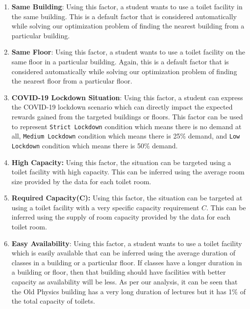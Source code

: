\begin{enumerate}
    \item \textbf{Same Building}: Using this factor, a student wants to use a toilet facility in the same building. This is a default factor that is considered automatically while solving our optimization problem of finding the nearest building from a particular building.
    
     \item \textbf{Same Floor}: Using this factor, a student wants to use a toilet facility on the same floor in a particular building. Again, this is a default factor that is considered automatically while solving our optimization problem of finding the nearest floor from a particular floor.
     
     \item \textbf{COVID-19 Lockdown Situation}: Using this factor, a student can express the COVID-19 lockdown scenario which can directly impact the expected rewards gained from the targeted buildings or floors. This factor can be used to represent \texttt{Strict Lockdown} condition which means there is no demand at all, \texttt{Medium Lockdown} condition which means there is 25\% demand, and \texttt{Low Lockdown} condition which means there is 50\% demand.
    
    \item \textbf{High Capacity:} Using this factor, the situation can be targeted using a toilet facility with high capacity. This can be inferred using the average room size provided by the data for each toilet room.
    
    \item \textbf{Required Capacity(C):} Using this factor, the situation can be targeted at using a toilet facility with a very specific capacity requirement $C$. This can be inferred using the supply of room capacity provided by the data for each toilet room.
    
    \item \textbf{Easy Availability}: Using this factor, a student wants to use a toilet facility which is easily available that can be inferred using the average duration of classes in a building or a particular floor. If classes have a longer duration in a building or floor, then that building should have facilities with better capacity as availability will be less. As per our analysis, it can be seen that the Old Physics building has a very long duration of lectures but it has 1\% of the total capacity of toilets.
    

\end{enumerate}
